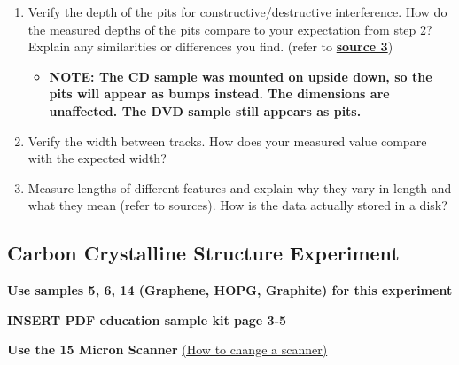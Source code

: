 \documentclass{../lab}
\begin{document}
\begin{enumerate}
    \item Verify the depth of the pits for constructive/destructive interference. How do the measured depths of the pits compare to your expectation from step 2?  Explain any similarities or differences you find.  (refer to \href{http://experimentationlab.berkeley.edu/sites/default/files/How_do_Rewriteable_CDs_work.pdf}{\textbf{source 3}})

    \begin{itemize}
        \item ​​\textbf{NOTE: The CD sample was mounted on upside down, so the pits will appear as bumps instead.  The dimensions are unaffected.  The DVD sample still appears as pits.}

    \end{itemize}

    \item Verify the width between tracks. How does your measured value compare with the expected width?

    \item Measure lengths of different features and explain why they vary in length and what they mean (refer to sources).  How is the data actually stored in a disk?

\end{enumerate}

\subsection{Carbon Crystalline Structure Experiment}
\label{subsec:CarbonCrystal}

\textbf{Use samples 5, 6, 14 (Graphene, HOPG, Graphite) for this experiment}

\textbf{INSERT PDF education sample kit page 3-5}

\textbf{Use the 15 Micron Scanner} \hyperref[subsec:ChangingScanners]{(How to change a scanner)}
\end{document}
